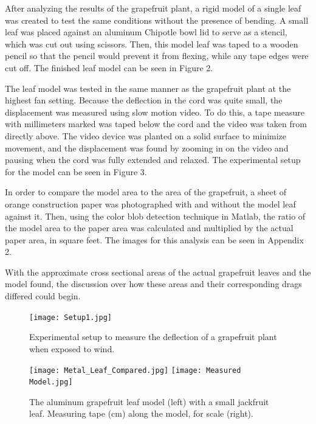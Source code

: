 \documentclass[]{article}
\begin{document}
	After analyzing the results of the grapefruit plant, a rigid model of a single leaf was created to test the same conditions without the presence of bending. A small leaf was placed against an aluminum Chipotle bowl lid to serve as a stencil, which was cut out using scissors. Then, this model leaf was taped to a wooden pencil so that the pencil would prevent it from flexing, while any tape edges were cut off. The finished leaf model can be seen in 
Figure 2.

	The leaf model was tested in the same manner as the grapefruit plant at the highest fan setting. Because the deflection in the cord was quite small, the displacement was measured using slow motion video. To do this, a tape measure with millimeters marked was taped below the cord and the video was taken from directly above. The video device was planted on a solid surface to minimize movement, and the displacement was found by zooming in on the video and pausing when the cord was fully extended and relaxed. The experimental setup for the model can be seen in Figure 3.

	In order to compare the model area to the area of the grapefruit, a sheet of orange construction paper was photographed with and without the model leaf against it. Then, using the color blob detection technique in Matlab, the ratio of the model area to the paper area was calculated and multiplied by the actual paper area, in square feet. The images for this analysis can be seen in Appendix 2.

	With the approximate cross sectional areas of the actual grapefruit leaves and the model found, the discussion over how these areas and their corresponding drags differed could begin.


\begin{figure}
\begin{center}
\texttt{[image: Setup1.jpg]} 
\end{center}
\caption{Experimental setup to measure the deflection of a grapefruit plant when exposed to wind.}
\label{fig:methods1}
\end{figure}

\begin{figure}
\begin{center}
\texttt{[image: Metal\_Leaf\_Compared.jpg]}
\texttt{[image: Measured Model.jpg]}
\end{center}
\caption{The aluminum grapefruit leaf model (left) with a small jackfruit leaf. Measuring tape (cm) along the model, for scale (right).}
\label{fig:methods2}
\end{figure}
\end{document}
